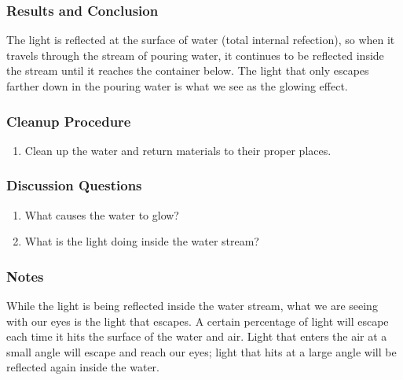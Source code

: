 \subsubsection*{Results and Conclusion}
The light is reflected at the surface of water (total internal refection), so when it travels through the stream of pouring water, it continues to be reflected inside the stream until it reaches the container below. The light that only escapes farther down in the pouring water is what we see as the glowing
effect.

\subsubsection*{Cleanup Procedure}
\begin{enumerate}
\item{Clean up the water and return materials to their proper places.}
\end{enumerate}

\subsubsection*{Discussion Questions}
\begin{enumerate}
\item{What causes the water to glow?}
\item{What is the light doing inside the water stream?}
\end{enumerate}

\subsubsection*{Notes}
While the light is being reflected inside the water stream, what we are seeing with our eyes is the light that escapes.  A certain percentage of light will escape each time it hits the surface of the water and air.  Light that enters the air at a small angle will escape and reach our eyes; light that hits at a large angle will be reflected again inside the water.
